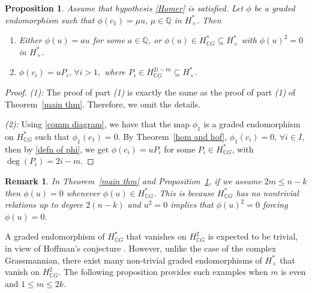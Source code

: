 \documentclass{amsart}
\newtheorem{proposition}[theorem]{Proposition}
\newtheorem{remark}[theorem]{Remark}
\newcommand{\thmref}[1]{Theorem~\ref{#1}}
\newcommand{\propref}[1]{Proposition~\ref{#1}}
\begin{document}
	
	\begin{proposition}\label{main thm 2}
		Assume that hypothesis \eqref{Homer} is satisfied.
		Let $\phi$ be a graded endomorphism such that $\phi(c_1)=\mu u,\, \mu \in \mathbb{Q}$ in $H^*_{\times}$. Then
		\begin{enumerate}
			\item Either $\phi(u)=a u$ for some $a \in \mathbb{Q}$, or $\phi(u) \in H^*_{\mathbb{C}G} \subseteq H^*_{\times}$ with $\phi(u)^2=0$ in $H^*_{\times}$.
			\item  $\phi(c_i) = uP_i, \, \forall i >1,$ where $P_i \in H^{2i-m}_{\mathbb CG}\subseteq H^*_\times$. 
		\end{enumerate}
	\end{proposition}
	\begin{proof} \textit{(1):} The proof of part \textit{(1)} is exactly the same as the proof of part \textit{(1)} of \thmref{main thm}. Therefore, we omit the details.
		
		\textit{(2):} Using \eqref{comm diagram}, we have that the map $\phi_1$ is a graded endomorphism on $H^*_{\mathbb{C}G}$ such that $\phi_1(c_1) =0$. By \thmref{hom and hof}, $\phi_1(c_i) =0, \, \forall i\in I$, then by \eqref{defn of phi}, we get $\phi(c_i) = uP_i$ for some $P_i \in H^*_{\mathbb{C}G}$, with $\deg(P_i) = 2i - m$. \end{proof}
	\begin{remark}
		In \thmref{main thm} and \propref{main thm 2}, if we assume $2m \leq n-k$  then $\phi(u)=0$ whenever $\phi(u) \in H^*_{\mathbb{C}G}$. This is because $H^*_{\mathbb{C}G}$ has no nontrivial relations up to degree $2(n-k)$ and $u^2=0$ implies that $\phi(u)^2=0$ forcing $\phi(u)=0$.
		
	\end{remark}
   A graded endomorphism of $H^*_{\mathbb CG}$ that vanishes on
   $H^2_{\mathbb CG}$ is expected to be trivial, in view of Hoffman’s conjecture \cite{hoffman}. However, unlike the case of the complex Grassmannian, there exist many non-trivial graded endomorphisms of $H^*_\times$ that vanish on $H^2_{\mathbb CG}$. The following proposition provides   such examples when $m$ is even and   $1\le m \le 2k$.
\end{document}
